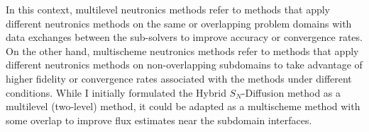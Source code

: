 In this context, multilevel neutronics methods refer to methods that apply different neutronics
methods on the same or overlapping problem domains with data exchanges between the sub-solvers to
improve accuracy or convergence rates. On the other hand, multischeme neutronics methods refer to
methods that apply different neutronics methods on non-overlapping subdomains to take advantage of
higher fidelity or convergence rates associated with the methods under different conditions. While
I initially formulated the Hybrid $S_N$-Diffusion method as a multilevel (two-level) method, it
could be adapted as a multischeme method with some overlap to improve flux estimates near the
subdomain interfaces.
